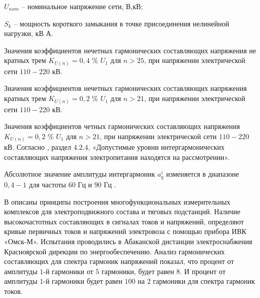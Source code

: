 $U_{nom}$ – номинальное напряжение сети, В,кВ;

$S_k$ – мощность короткого замыкания в точке присоединения нелинейной нагрузки, кВ А.

Значения коэффициентов нечетных гармонических составляющих напряжения не кратных трем $K_{U(n)}=0,4$ \% $U_1$ для $n>25$, при напряжении электрической сети $110-220$ кВ.

Значения коэффициентов нечетных гармонических составляющих напряжения кратных трем $K_{U(n)}=0,2$ \% $U_1$ для $n>21$, при напряжении электрической сети $110-220$ кВ.

Значения коэффициентов четных гармонических составляющих напряжения $K_{U(n)}=0,2$ \% $U_1$ для $n>21$, при напряжении электрической сети $110-220$ кВ.
Согласно \cite{GOST32144-2013}, раздел $4.2.4$, «Допустимые уровни интергармонических составляющих напряжения электропитания находятся на рассмотрении».

Абсолютное значение амплитуды интергармоник $a_q^i$ изменяется в диапазоне $0,4-1$ для частоты $60$ Гц и $90$ Гц \cite{testa2007интергармоники}.

В \cite{Improving_methods_Shizma_2014, ramos2017power}описаны принципы построения многофункциональных измерительных комплексов для электроподвижного состава и тяговых подстанций.
Наличие высокочастотных составляющих в сигналах токов и напряжений, определяют кривые первичных токов и напряжений электровоза с помощью прибора ИВК «Омск-М». Испытания проводились в Абаканской дистанции электроснабжения Красноярской дирекции по энергообеспечению. Анализ гармонических составляющих для спектра гармоник напряжений показал, что процент от амплитуды $1$-й гармоники от $5$ гармоники, будет равен $8$. И процент от амплитуды $1$-й гармоники будет равен $100$ на $2$ гармоники для спектра гармоник токов.

